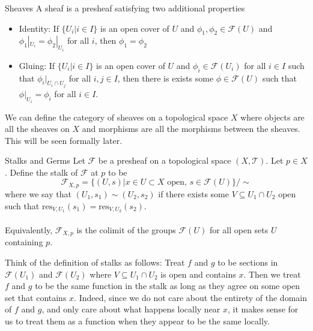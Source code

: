 \documentclass[a4paper]{article}
\begin{document}
\begin{defn}{Sheaves}{} A sheaf is a presheaf satisfying two additional properties
\begin{itemize}
\item Identity: If $\{U_i|i\in I\}$ is an open cover of $U$ and $\phi_1,\phi_2\in\mathcal{F}(U)$ and $\phi_1|_{U_i}=\phi_2|_{U_i}$ for all $i$, then $\phi_1=\phi_2$
\item Gluing: If $\{U_i|i\in I\}$ is an open cover of $U$ and $\phi_i\in\mathcal{F}(U_i)$ for all $i\in I$ such that $\phi_i|_{U_i\cap U_j}$ for all $i,j\in I$, then there is exists some $\phi\in\mathcal{F}(U)$ such that $\phi|_{U_i}=\phi_i$ for all $i\in I$. 
\end{itemize}
\end{defn}

We can define the category of sheaves on a topological space $X$ where objects are all the sheaves on $X$ and morphisms are all the morphisms between the sheaves. This will be seen formally later. 

\begin{defn}{Stalks and Germs}{} Let $\mathcal{F}$ be a presheaf on a topological space $(X,\mathcal{T})$. Let $p\in X$. Define the stalk of $\mathcal{F}$ at $p$ to be $$\mathcal{F}_{X,p}=\{(U,s)|x\in U\subset X\text{ open, }s\in\mathcal{F}(U)\}/\sim$$ where we say that $(U_1,s_1)\sim(U_2,s_2)$ if there exists some $V\subseteq U_1\cap U_2$ open such that $\text{res}_{V,U_1}(s_1)=\text{res}_{V,U_2}(s_2)$. \\~\\
Equivalently, $\mathcal{F}_{X,p}$ is the colimit of the groups $\mathcal{F}(U)$ for all open sets $U$ containing $p$. 
\end{defn}

Think of the definition of stalks as follows: Treat $f$ and $g$ to be sections in $\mathcal{F}(U_1)$ and $\mathcal{F}(U_2)$ where $V\subseteq U_1\cap U_2$ is open and contains $x$. Then we treat $f$ and $g$ to be the same function in the stalk as long as they agree on some open set that contains $x$. Indeed, since we do not care about the entirety of the domain of $f$ and $g$, and only care about what happens locally near $x$, it makes sense for us to treat them as a function when they appear to be the same locally. 
\end{document}
